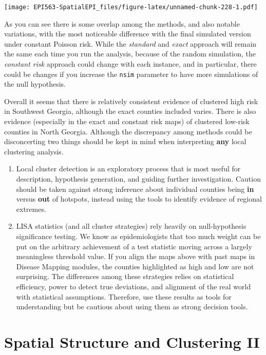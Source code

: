 \documentclass[
]{book}
\newcommand{\passthrough}[1]{#1}
\providecommand{\tightlist}{%
  \setlength{\itemsep}{0pt}\setlength{\parskip}{0pt}}
\begin{document}
\texttt{[image: EPI563-SpatialEPI\_files/figure-latex/unnamed-chunk-228-1.pdf]}

As you can see there is some overlap among the methods, and also notable variations, with the most noticeable difference with the final simulated version under constant Poisson risk. While the \emph{standard} and \emph{exact} approach will remain the same each time you run the analysis, because of the random simulation, the \emph{constant risk} approach could change with each instance, and in particular, there could be changes if you increase the \passthrough{\lstinline!nsim!} parameter to have more simulations of the null hypothesis.

Overall it seems that there is relatively consistent evidence of clustered high risk in Southwest Georgia, although the exact counties included varies. There is also evidence (especially in the exact and constant risk maps) of clustered low-risk counties in North Georgia. Although the discrepancy among methods could be disconcerting two things should be kept in mind when interpreting \textbf{any} local clustering analysis.

\begin{enumerate}
\def\labelenumi{\arabic{enumi}.}
\tightlist
\item
  Local cluster detection is an exploratory process that is most useful for description, hypothesis generation, and guiding further investigation. Caution should be taken against strong inference about individual counties being \textbf{in} versus \textbf{out} of hotspots, instead using the tools to identify evidence of regional extremes.
\item
  LISA statistics (and all cluster strategies) rely heavily on null-hypothesis significance testing. We know as epidemiologists that too much weight can be put on the arbitrary achievement of a test statistic moving across a largely meaningless threshold value. If you align the maps above with past maps in Disease Mapping modules, the counties highlighted as high and low are not surprising. The differences among these strategies relies on statistical efficiency, power to detect true deviations, and alignment of the real world with statistical assumptions. Therefore, use these results as tools for understanding but be cautious about using them as strong decision tools.
\end{enumerate}

\hypertarget{spatial-structure-and-clustering-ii}{%
\chapter{Spatial Structure and Clustering II}\label{spatial-structure-and-clustering-ii}}
\end{document}
